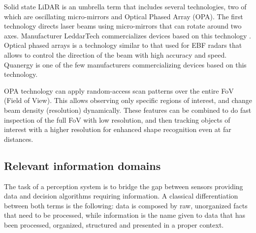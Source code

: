 \documentclass[journal]{IEEEtran}
\begin{document}
Solid state LiDAR is an umbrella term that includes several technologies, two 
of which are oscillating micro-mirrors and Optical Phased Array (OPA).
The first technology directs laser beams using micro-mirrors that can 
rotate around two axes. Manufacturer LeddarTech commercializes devices
based on this technology \cite{LeddarTech2016}.
Optical phased arrays \cite{McManamon1996} is a technology similar to that used 
for EBF radars 
that allows to control the direction of the beam with high accuracy and speed.
Quanergy \cite{Eldada2017} is one of the few manufacturers commercializing
devices based on this technology.

OPA technology can apply random-access scan patterns over the entire FoV 
(Field of View). This allows observing only specific regions of interest, and
change beam density (resolution) dynamically. 
These features can be combined to do fast inspection of the full FoV with low
resolution, and then tracking objects of interest with a higher resolution for 
enhanced shape recognition even at far distances.

\subsection{Relevant information domains}
\label{sec:03-d-information-domains}

The task of a perception system is to bridge the gap between sensors providing 
data and decision algorithms requiring information.
A classical differentiation between both terms is the following: data is 
composed by raw, unorganized facts that need to be processed, while  
information is the name given to data that has been processed, organized, 
structured and presented in a proper context.
\end{document}
